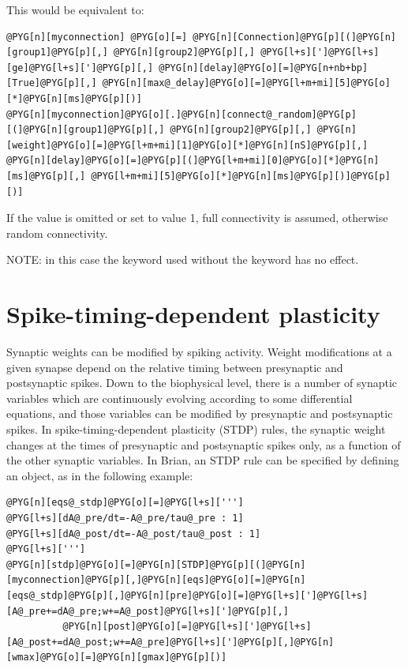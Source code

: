 \documentclass[letterpaper,10pt,english]{manual}
\begin{document}
This would be equivalent to:

\begin{Verbatim}[commandchars=@\[\]]
@PYG[n][myconnection] @PYG[o][=] @PYG[n][Connection]@PYG[p][(]@PYG[n][group1]@PYG[p][,] @PYG[n][group2]@PYG[p][,] @PYG[l+s][']@PYG[l+s][ge]@PYG[l+s][']@PYG[p][,] @PYG[n][delay]@PYG[o][=]@PYG[n+nb+bp][True]@PYG[p][,] @PYG[n][max@_delay]@PYG[o][=]@PYG[l+m+mi][5]@PYG[o][*]@PYG[n][ms]@PYG[p][)]
@PYG[n][myconnection]@PYG[o][.]@PYG[n][connect@_random]@PYG[p][(]@PYG[n][group1]@PYG[p][,] @PYG[n][group2]@PYG[p][,] @PYG[n][weight]@PYG[o][=]@PYG[l+m+mi][1]@PYG[o][*]@PYG[n][nS]@PYG[p][,] @PYG[n][delay]@PYG[o][=]@PYG[p][(]@PYG[l+m+mi][0]@PYG[o][*]@PYG[n][ms]@PYG[p][,] @PYG[l+m+mi][5]@PYG[o][*]@PYG[n][ms]@PYG[p][)]@PYG[p][)]
\end{Verbatim}

If the  value is omitted or set to value 1, full connectivity is assumed,
otherwise random connectivity.

NOTE: in this case the  keyword used without the  keyword has no effect.

\resetcurrentobjects
\hypertarget{--doc-stdp}{}

\section{Spike-timing-dependent plasticity}

Synaptic weights can be modified by spiking activity.
Weight modifications at a given synapse depend on the relative
timing between presynaptic and postsynaptic spikes. Down to the
biophysical level, there is a number of synaptic variables which
are continuously evolving according to some differential equations,
and those variables can be modified by presynaptic and postsynaptic
spikes. In spike-timing-dependent plasticity (STDP) rules, the synaptic weight
changes at the times of presynaptic and postsynaptic
spikes only, as a function of the other synaptic variables.
In Brian, an STDP rule can be specified by defining an
\hyperlink{brian.STDP}{} object, as in the following example:

\begin{Verbatim}[commandchars=@\[\]]
@PYG[n][eqs@_stdp]@PYG[o][=]@PYG[l+s][''']
@PYG[l+s][dA@_pre/dt=-A@_pre/tau@_pre : 1]
@PYG[l+s][dA@_post/dt=-A@_post/tau@_post : 1]
@PYG[l+s][''']
@PYG[n][stdp]@PYG[o][=]@PYG[n][STDP]@PYG[p][(]@PYG[n][myconnection]@PYG[p][,]@PYG[n][eqs]@PYG[o][=]@PYG[n][eqs@_stdp]@PYG[p][,]@PYG[n][pre]@PYG[o][=]@PYG[l+s][']@PYG[l+s][A@_pre+=dA@_pre;w+=A@_post]@PYG[l+s][']@PYG[p][,]
          @PYG[n][post]@PYG[o][=]@PYG[l+s][']@PYG[l+s][A@_post+=dA@_post;w+=A@_pre]@PYG[l+s][']@PYG[p][,]@PYG[n][wmax]@PYG[o][=]@PYG[n][gmax]@PYG[p][)]
\end{Verbatim}
\end{document}
